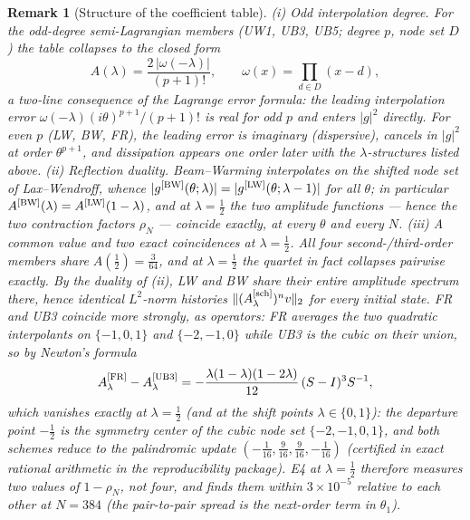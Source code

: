 \documentclass[pdflatex,sn-mathphys-num]{sn-jnl}%
\theoremstyle{thmstyleone}%
\theoremstyle{thmstyletwo}%
\newtheorem{remark}{Remark}%
\theoremstyle{thmstylethree}%
\newcommand{\Asch}{A^{[\rm sch]}_\lambda}
\begin{document}
\begin{remark}[Structure of the coefficient table]\label{rem:coefficient-structure}
(i) \emph{Odd interpolation degree.}
For the odd-degree semi-Lagrangian members (UW1, UB3, UB5; degree $p$, node set $D$) the table collapses to the closed form \[ A(\lambda)=\frac{2\,|\omega(-\lambda)|}{(p+1)!}, \qquad \omega(x)=\prod_{d\in D}(x-d), \] a two-line consequence of the Lagrange error formula: the leading interpolation error $\omega(-\lambda)(i\theta)^{p+1}/(p+1)!$ is \emph{real} for odd $p$ and enters $|g|^2$ directly.
For even $p$ (LW, BW, FR), the leading error is imaginary (dispersive), cancels in $|g|^2$ at order $\theta^{p+1}$, and dissipation appears one order later with the $\lambda$-structures listed above.
(ii) \emph{Reflection duality.}
Beam--Warming interpolates on the shifted node set of Lax--Wendroff, whence $|g^{[\rm BW]}(\theta;\lambda)|=|g^{[\rm LW]}(\theta;\lambda-1)|$ for all $\theta$; in particular $A^{[\rm BW]}(\lambda)=A^{[\rm LW]}(1-\lambda)$, and at $\lambda=\tfrac12$ the two amplitude functions --- hence the two contraction factors $\rho_N$ --- coincide \emph{exactly}, at every $\theta$ and every $N$.
(iii) \emph{A common value and two exact coincidences at $\lambda=\tfrac12$.}
All four second-/third-order members share $A(\tfrac12)=\tfrac3{64}$, and at $\lambda=\tfrac12$ the quartet in fact collapses \emph{pairwise exactly}.
By the duality of (ii), LW and BW share their entire amplitude spectrum there, hence identical $L^2$-norm histories $\|(\Asch)^nv\|_2$ for every initial state.
FR and UB3 coincide more strongly, as \emph{operators}: FR averages the two quadratic interpolants on $\{-1,0,1\}$ and $\{-2,-1,0\}$ while UB3 is the cubic on their union, so by Newton's formula \[ A^{[\rm FR]}_\lambda-A^{[\rm UB3]}_\lambda =-\frac{\lambda(1-\lambda)(1-2\lambda)}{12}\,(S-I)^{3}S^{-1}, \] which vanishes exactly at $\lambda=\tfrac12$ (and at the shift points $\lambda\in\{0,1\}$): the departure point $-\tfrac12$ is the symmetry center of the cubic node set $\{-2,-1,0,1\}$, and both schemes reduce to the palindromic update $(-\tfrac1{16},\tfrac9{16},\tfrac9{16},-\tfrac1{16})$ (certified in exact rational arithmetic in the reproducibility package).
E4 at $\lambda=\tfrac12$ therefore measures two values of $1-\rho_N$, not four, and finds them within $3\times10^{-5}$ relative to each other at $N=384$ (the pair-to-pair spread is the next-order term in $\theta_1$).
\end{remark}
\end{document}
